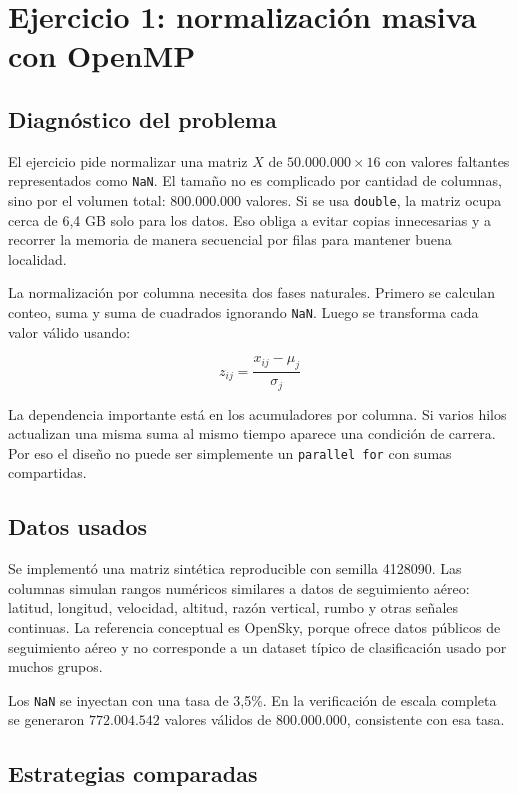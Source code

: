 \documentclass[letterpaper,11pt]{article}
\begin{document}
\section{Ejercicio 1: normalización masiva con OpenMP}

\subsection{Diagnóstico del problema}

El ejercicio pide normalizar una matriz \(X\) de \(50.000.000 \times 16\) con valores faltantes representados como \texttt{NaN}. El tamaño no es complicado por cantidad de columnas, sino por el volumen total: \(800.000.000\) valores. Si se usa \texttt{double}, la matriz ocupa cerca de 6,4 GB solo para los datos. Eso obliga a evitar copias innecesarias y a recorrer la memoria de manera secuencial por filas para mantener buena localidad.

La normalización por columna necesita dos fases naturales. Primero se calculan conteo, suma y suma de cuadrados ignorando \texttt{NaN}. Luego se transforma cada valor válido usando:

\[
z_{ij} = \frac{x_{ij} - \mu_j}{\sigma_j}
\]

La dependencia importante está en los acumuladores por columna. Si varios hilos actualizan una misma suma al mismo tiempo aparece una condición de carrera. Por eso el diseño no puede ser simplemente un \texttt{parallel for} con sumas compartidas.

\subsection{Datos usados}

Se implementó una matriz sintética reproducible con semilla 4128090. Las columnas simulan rangos numéricos similares a datos de seguimiento aéreo: latitud, longitud, velocidad, altitud, razón vertical, rumbo y otras señales continuas. La referencia conceptual es OpenSky, porque ofrece datos públicos de seguimiento aéreo y no corresponde a un dataset típico de clasificación usado por muchos grupos.

Los \texttt{NaN} se inyectan con una tasa de 3,5\%. En la verificación de escala completa se generaron \(772.004.542\) valores válidos de \(800.000.000\), consistente con esa tasa.

\subsection{Estrategias comparadas}
\end{document}
